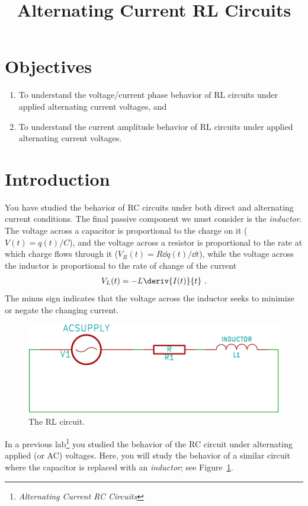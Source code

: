 \documentclass[12pt]{article}
\title{Alternating Current RL Circuits}
\author{}
\date{}
\begin{document}
\maketitle

\section{Objectives}
\label{sec:objectives}

\begin{enumerate}
\item To understand the voltage/current phase behavior of RL circuits
  under applied alternating current voltages, and
\item To understand the current amplitude behavior of RL circuits
  under applied alternating current voltages.
\end{enumerate}

\section{Introduction}
\label{sec:introduction}

You have studied the behavior of RC circuits under both direct and
alternating current conditions.  The final passive component we must
consider is the \textit{inductor}.  The voltage across a capacitor is
proportional to the charge on it ($V(t) = q(t)/C$), and the voltage
across a resistor is proportional to the rate at which charge flows
through it ($V_R(t) = R \dd q(t)/\dd t$), while the voltage across the
inductor is proportional to the rate of change of the current
\begin{gather*}
  V_L(t) = - L \deriv{I(t)}{t}\ .
\end{gather*}
The minus sign indicates that the voltage across the inductor seeks to
minimize or negate the changing current.

\begin{figure}
  \centering
  \includegraphics[width=2\textwidth/3]{figures/rl-circuit}
  \caption{The RL circuit.}
  \label{fig:rlcircuit}
\end{figure}
In a previous lab\footnote{\textit{Alternating Current RC Circuits}}
you studied the behavior of the RC circuit under alternating applied
(or AC) voltages.  Here, you will study the behavior of a similar
circuit where the capacitor is replaced with an \textit{inductor}; see
Figure~\ref{fig:rlcircuit}. 
\end{document}
